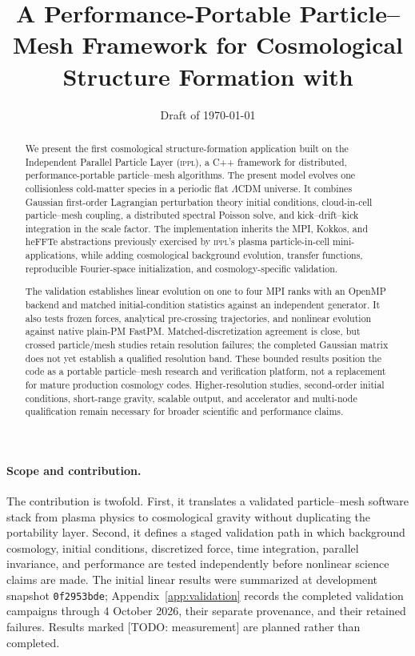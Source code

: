 \documentclass[11pt]{article}
\title{A Performance-Portable Particle--Mesh Framework for Cosmological
Structure Formation with \IPPL}
\author{\todo{author list and affiliations}}
\date{Draft of \today}
\newcommand{\IPPL}{\textnormal{\textsc{ippl}}\xspace}
\newcommand{\todo}[1]{\textcolor{red!70!black}{[TODO: #1]}}
\begin{document}
\maketitle

\begin{abstract}
We present the first cosmological structure-formation application built on the
Independent Parallel Particle Layer (\IPPL), a C++ framework for distributed,
performance-portable particle--mesh algorithms.  The present model evolves one
collisionless cold-matter species in a periodic flat $\Lambda$CDM universe.  It
combines Gaussian first-order Lagrangian perturbation theory initial conditions,
cloud-in-cell particle--mesh coupling, a distributed spectral Poisson solve, and
kick--drift--kick integration in the scale factor.  The implementation inherits
the MPI, Kokkos, and heFFTe abstractions previously exercised by \IPPL's plasma
particle-in-cell mini-applications, while adding cosmological background
evolution, transfer functions, reproducible Fourier-space initialization, and
cosmology-specific validation.

The validation establishes linear evolution on one to four MPI ranks with an
OpenMP backend and matched initial-condition statistics against an independent
generator.  It also tests frozen forces, analytical pre-crossing trajectories,
and nonlinear evolution against native plain-PM FastPM.  Matched-discretization
agreement is close, but crossed particle/mesh studies retain resolution failures;
the completed Gaussian matrix does not yet establish a qualified resolution
band.  These bounded results position the code as a portable particle--mesh
research and verification platform, not a replacement for mature production
cosmology codes.  Higher-resolution studies, second-order initial conditions,
short-range gravity, scalable output, and accelerator and multi-node qualification
remain necessary for broader scientific and performance claims.
\end{abstract}

\paragraph{Scope and contribution.}
The contribution is twofold.  First, it translates a validated particle--mesh
software stack from plasma physics to cosmological gravity without duplicating
the portability layer.  Second, it defines a staged validation path in which
background cosmology, initial conditions, discretized force, time integration,
parallel invariance, and performance are tested independently before nonlinear
science claims are made.  The initial linear results were summarized at
development snapshot \texttt{0f2953bde}; Appendix~\ref{app:validation} records
the completed validation campaigns through 4 October 2026, their separate
provenance, and their retained failures.  Results marked \todo{measurement}
are planned rather than completed.
\end{document}

